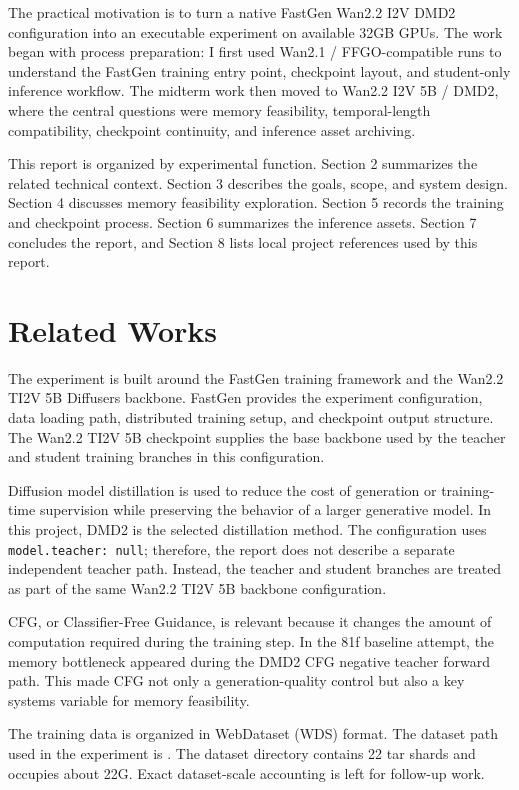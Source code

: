 \documentclass[12pt,a4paper]{article}
\begin{document}
The practical motivation is to turn a native FastGen Wan2.2 I2V DMD2 configuration into an executable experiment on available 32GB GPUs. The work began with process preparation: I first used Wan2.1 / FFGO-compatible runs to understand the FastGen training entry point, checkpoint layout, and student-only inference workflow. The midterm work then moved to Wan2.2 I2V 5B / DMD2, where the central questions were memory feasibility, temporal-length compatibility, checkpoint continuity, and inference asset archiving.

This report is organized by experimental function. Section 2 summarizes the related technical context. Section 3 describes the goals, scope, and system design. Section 4 discusses memory feasibility exploration. Section 5 records the training and checkpoint process. Section 6 summarizes the inference assets. Section 7 concludes the report, and Section 8 lists local project references used by this report.

\section{Related Works}

The experiment is built around the FastGen training framework and the Wan2.2 TI2V 5B Diffusers backbone. FastGen provides the experiment configuration, data loading path, distributed training setup, and checkpoint output structure. The Wan2.2 TI2V 5B checkpoint supplies the base backbone used by the teacher and student training branches in this configuration.

Diffusion model distillation is used to reduce the cost of generation or training-time supervision while preserving the behavior of a larger generative model. In this project, DMD2 is the selected distillation method. The configuration uses \texttt{model.teacher: null}; therefore, the report does not describe a separate independent teacher path. Instead, the teacher and student branches are treated as part of the same Wan2.2 TI2V 5B backbone configuration.

CFG, or Classifier-Free Guidance, is relevant because it changes the amount of computation required during the training step. In the 81f baseline attempt, the memory bottleneck appeared during the DMD2 CFG negative teacher forward path. This made CFG not only a generation-quality control but also a key systems variable for memory feasibility.

The training data is organized in WebDataset (WDS) format. The dataset path used in the experiment is . The dataset directory contains 22 tar shards and occupies about 22G. Exact dataset-scale accounting is left for follow-up work.
\end{document}
